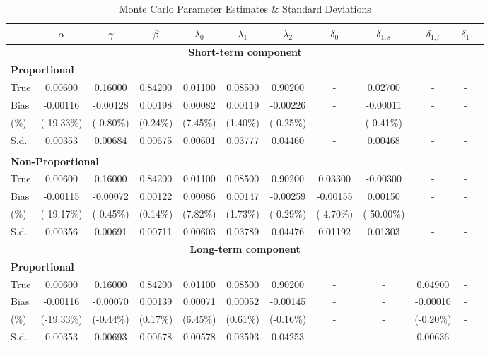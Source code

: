 \documentclass{article}
\begin{document}
\pagebreak
\begin{table}
\centering
\caption{Monte Carlo Parameter Estimates \& Standard Deviations}
\begin{tabular}{lccccccccccc}
\midrule
\midrule
\mbox{} & $\alpha$ & $\gamma$ & $\beta$ & $\lambda_0$ & $\lambda_1$ & $\lambda_2$ & $\delta_0$ & $\delta_{1,s}$ & $\delta_{1,l}$ & $\delta_{1}$\\
\midrule
\multicolumn{12}{c}{\textbf{Short-term component}}\\
\multicolumn{12}{l}{\textbf{Proportional}}\\
True & 0.00600 & 0.16000 & 0.84200 & 0.01100 & 0.08500 & 0.90200 & - & 0.02700 & - & -\\
Bias & -0.00116 & -0.00128 & 0.00198 & 0.00082 & 0.00119 & -0.00226 & - & -0.00011 & - & -\\
(\%) & (-19.33\%) & (-0.80\%)& (0.24\%) & (7.45\%) & (1.40\%) & (-0.25\%) & - & (-0.41\%) & - & -\\
S.d. & 0.00353 & 0.00684 & 0.00675 & 0.00601 & 0.03777 & 0.04460 & - & 0.00468 & - & -\\
\mbox{}\\
\multicolumn{12}{l}{\textbf{Non-Proportional}}\\
True & 0.00600 & 0.16000 & 0.84200 & 0.01100 & 0.08500 & 0.90200 & 0.03300 & -0.00300 & - & -\\
Bias & -0.00115 & -0.00072 & 0.00122 & 0.00086 & 0.00147 & -0.00259 & -0.00155 & 0.00150 & - & -\\
(\%) & (-19.17\%) & (-0.45\%) & (0.14\%) & (7.82\%) & (1.73\%) & (-0.29\%) & (-4.70\%) & (-50.00\%) & - & -\\
S.d. & 0.00356 & 0.00691 & 0.00711 & 0.00603 & 0.03789 & 0.04476 & 0.01192 & 0.01303 & - & -\\
\midrule
\multicolumn{12}{c}{\textbf{Long-term component}}\\
\multicolumn{12}{l}{\textbf{Proportional}}\\
True & 0.00600 & 0.16000 & 0.84200 & 0.01100 & 0.08500 & 0.90200 & - & - & 0.04900  & -\\
Bias & -0.00116 & -0.00070 & 0.00139 & 0.00071 & 0.00052 & -0.00145 & - & - & -0.00010 & -\\
(\%) & (-19.33\%) & (-0.44\%) & (0.17\%) & (6.45\%) & (0.61\%) & (-0.16\%) & - & - & (-0.20\%) & -\\
S.d. & 0.00353 & 0.00693 & 0.00678 & 0.00578 & 0.03593 & 0.04253 & - & - & 0.00636 & -\\
\mbox{}\\

\end{tabular}
\end{table}
\end{document}
